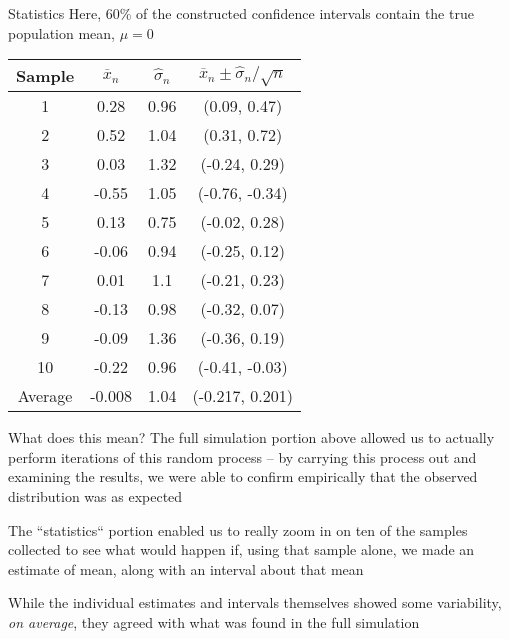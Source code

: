 \documentclass{beamer}
\begin{document}
\begin{frame}{Statistics}
Here, 60\% of the constructed confidence intervals contain the true population mean, $\mu = 0$
\begin{center}
\begin{table}[ht]  
\centering
\begin{tabular}{cccc}
  \hline
Sample & $\overline{x}_n$ & $\hat{\sigma}_n$ & $\overline{x}_n \pm \hat{\sigma}_n/\sqrt{n}$ \\ 
  \hline
\rowcolor{pink} 1 & 0.28 & 0.96 & (0.09, 0.47) \\ 
\rowcolor{pink}  2 & 0.52 & 1.04 & (0.31, 0.72) \\ 
  3 & 0.03 & 1.32 & (-0.24, 0.29) \\ 
\rowcolor{pink}  4 & -0.55 & 1.05 & (-0.76, -0.34) \\ 
  5 & 0.13 & 0.75 & (-0.02, 0.28) \\ 
  6 & -0.06 & 0.94 & (-0.25, 0.12) \\ 
  7 & 0.01 & 1.1 & (-0.21, 0.23) \\ 
  8 & -0.13 & 0.98 & (-0.32, 0.07) \\ 
  9 & -0.09 & 1.36 & (-0.36, 0.19) \\ 
\rowcolor{pink}  10 & -0.22 & 0.96 & (-0.41, -0.03) \\ 
   \hline
Average & -0.008 & 1.04 & (-0.217, 0.201) \\
\hline
\end{tabular}
\end{table}
\end{center}
\end{frame}

\begin{frame}{What does this mean?}
The full simulation portion above allowed us to actually perform iterations of this random process -- by carrying this process out and examining the results, we were able to confirm empirically that the observed distribution was as expected \\ \vspace{3mm}  

The ``statistics`` portion enabled us to really zoom in on ten of the samples collected to see what would happen if, using that sample alone, we made an estimate of mean, along with an interval about that mean \\ \vspace{3mm}

While the individual estimates and intervals themselves showed some variability, \textit{on average}, they agreed with what was found in the full simulation
\end{frame}
\end{document}
